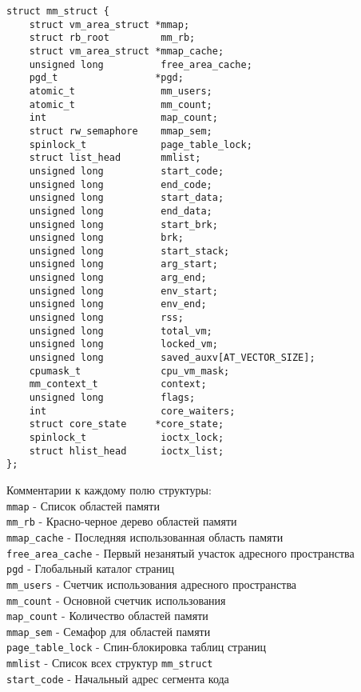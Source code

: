 \documentclass[12pt]{article}
\begin{document}
\begin{lstlisting}
struct mm_struct {
    struct vm_area_struct *mmap; 
    struct rb_root         mm_rb; 
    struct vm_area_struct *mmap_cache;
    unsigned long          free_area_cache;
    pgd_t                 *pgd;
    atomic_t               mm_users;
    atomic_t               mm_count;
    int                    map_count;
    struct rw_semaphore    mmap_sem;
    spinlock_t             page_table_lock;
    struct list_head       mmlist;
    unsigned long          start_code;
    unsigned long          end_code;
    unsigned long          start_data;
    unsigned long          end_data;
    unsigned long          start_brk;
    unsigned long          brk;
    unsigned long          start_stack;
    unsigned long          arg_start;
    unsigned long          arg_end;
    unsigned long          env_start;
    unsigned long          env_end;
    unsigned long          rss;
    unsigned long          total_vm;
    unsigned long          locked_vm;
    unsigned long          saved_auxv[AT_VECTOR_SIZE];
    cpumask_t              cpu_vm_mask;
    mm_context_t           context;
    unsigned long          flags;
    int                    core_waiters;
    struct core_state     *core_state;
    spinlock_t             ioctx_lock;
    struct hlist_head      ioctx_list;
};
\end{lstlisting}
\pagebreak
Комментарии к каждому полю структуры: \\
\verb!mmap! - Список областей памяти \\
\verb!mm_rb! - Красно-черное дерево областей памяти \\
\verb!mmap_cache! - Последняя использованная область памяти \\
\verb!free_area_cache! - Первый незанятый участок адресного пространства \\
\verb!pgd! - Глобальный каталог страниц\\
\verb!mm_users! - Счетчик использования адресного пространства\\
\verb!mm_count! - Основной счетчик использования\\
\verb!map_count! - Количество областей памяти\\
\verb!mmap_sem! - Семафор для областей памяти\\
\verb!page_table_lock! - Спин-блокировка таблиц страниц\\
\verb!mmlist! - Список всех структур \verb!mm_struct!\\
\verb!start_code! - Начальный адрес сегмента кода\\
\end{document}

